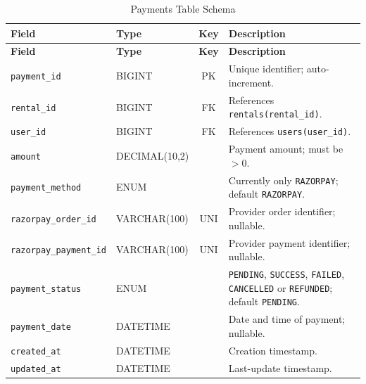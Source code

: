 \documentclass[10pt,a4paper]{report}
\newcommand{\col}[1]{\texttt{#1}}
\begin{document}
{\begin{longtable}{@{}llc>{\raggedright\arraybackslash}p{6.6cm}@{}}
\caption{Payments Table Schema}\label{tab:payments}\\
\toprule \textbf{Field} & \textbf{Type} & \textbf{Key} & \textbf{Description}\\ \midrule \endfirsthead
\toprule \textbf{Field} & \textbf{Type} & \textbf{Key} & \textbf{Description}\\ \midrule \endhead
\bottomrule \endfoot
\col{payment_id} & BIGINT & PK & Unique identifier; auto-increment.\\
\col{rental_id} & BIGINT & FK & References \col{rentals(rental_id)}.\\
\col{user_id} & BIGINT & FK & References \col{users(user_id)}.\\
\col{amount} & DECIMAL(10,2) & & Payment amount; must be $> 0$.\\
\col{payment_method} & ENUM & & Currently only \col{RAZORPAY}; default \col{RAZORPAY}.\\
\col{razorpay_order_id} & VARCHAR(100) & UNI & Provider order identifier; nullable.\\
\col{razorpay_payment_id} & VARCHAR(100) & UNI & Provider payment identifier; nullable.\\
\col{payment_status} & ENUM & & \col{PENDING}, \col{SUCCESS}, \col{FAILED}, \col{CANCELLED} or \col{REFUNDED}; default \col{PENDING}.\\
\col{payment_date} & DATETIME & & Date and time of payment; nullable.\\
\col{created_at} & DATETIME & & Creation timestamp.\\
\col{updated_at} & DATETIME & & Last-update timestamp.\\
\end{longtable}

}
\end{document}
